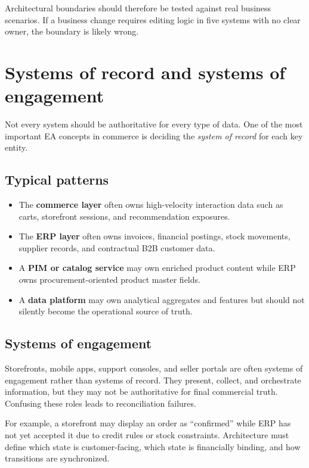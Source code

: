 Architectural boundaries should therefore be tested against real business scenarios.
If a business change requires editing logic in five systems with no clear owner, the boundary is likely wrong.

\section{Systems of record and systems of engagement}
Not every system should be authoritative for every type of data.
One of the most important EA concepts in commerce is deciding the \emph{system of record} for each key entity.

\subsection{Typical patterns}
\begin{itemize}
  \item The \textbf{commerce layer} often owns high-velocity interaction data such as carts, storefront sessions, and recommendation exposures.
  \item The \textbf{ERP layer} often owns invoices, financial postings, stock movements, supplier records, and contractual B2B customer data.
  \item A \textbf{PIM or catalog service} may own enriched product content while ERP owns procurement-oriented product master fields.
  \item A \textbf{data platform} may own analytical aggregates and features but should not silently become the operational source of truth.
\end{itemize}

\subsection{Systems of engagement}
Storefronts, mobile apps, support consoles, and seller portals are often systems of engagement rather than systems of record.
They present, collect, and orchestrate information, but they may not be authoritative for final commercial truth.
Confusing these roles leads to reconciliation failures.

For example, a storefront may display an order as ``confirmed'' while ERP has not yet accepted it due to credit rules or stock constraints.
Architecture must define which state is customer-facing, which state is financially binding, and how transitions are synchronized.


